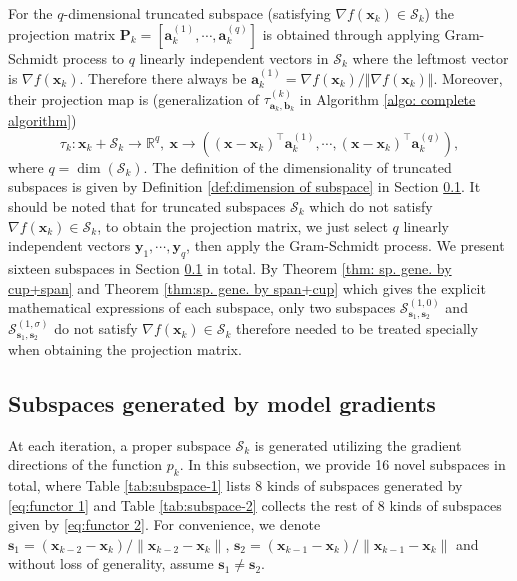 \documentclass[colorlinks=true, linkcolor=blue, citecolor=blue, urlcolor=blue]{article}
\theoremstyle{plain}
\theoremstyle{definition}
\theoremstyle{remark}
\begin{document}
For the $q$-dimensional truncated subspace (satisfying $\nabla f(\bm x_k)\in\mathcal{S}_k$) the projection matrix $\bm P_k=[\bm a_k^{(1)},\cdots,\bm a_k^{(q)}]$ is obtained through applying Gram-Schmidt process to $q$ linearly independent vectors in $\mathcal{S}_k$ where the leftmost vector is $\nabla f(\bm x_k)$. Therefore there always be $\bm a_k^{(1)}=\nabla f(\bm x_k)/\Vert\nabla f(\bm x_k)\Vert$. Moreover, their projection map is (generalization of $\tau_{\bm a_k,\bm b_k}^{(k)}$ in Algorithm \ref{algo: complete algorithm}) \begin{equation*}
    \tau_k: \bm x_k+\mathcal{S}_k\to\mathbb{R}^q,\ \bm x\to ( (\bm x-\bm x_k)^\top\bm a_k^{(1)},\cdots,(\bm x-\bm x_k)^\top\bm a_k^{(q)}),
\end{equation*}
where $q=\dim(\mathcal{S}_k)$. The definition of the dimensionality of truncated subspaces is given by Definition \ref{def:dimension of subspace} in Section \ref{section: subspace and dimension}. It should be noted that for truncated subspaces $\mathcal{S}_k$ which do not satisfy $\nabla f(\bm x_k)\in\mathcal{S}_k$, to obtain the projection matrix, we just select $q$ linearly independent vectors $\bm y_1,\cdots,\bm y_q$, then apply the Gram-Schmidt process. We present sixteen subspaces in Section \ref{section: subspace and dimension} in total. By Theorem \ref{thm: sp. gene. by cup+span} and Theorem \ref{thm:sp. gene. by span+cup} which gives the explicit mathematical expressions of each subspace, only two subspaces $\mathcal{S}_{\bm s_1,\bm s_2}^{(1,0)}$ and $\mathcal{S}_{\bm s_1,\bm s_2}^{(1,\sigma)}$ do not satisfy $\nabla f(\bm x_k)\in \mathcal{S}_k$ therefore needed to be treated specially when obtaining the projection matrix. 


\subsection{Subspaces generated by model gradients}\label{section: subspace and dimension}

At each iteration, a proper subspace $\mathcal{S}_k$ is generated utilizing the gradient directions of the function $p_k$. In this subsection, we provide 16 novel subspaces in total, where Table \ref{tab:subspace-1} lists 8 kinds of subspaces generated by \eqref{eq:functor 1} and Table \ref{tab:subspace-2} collects the rest of 8 kinds of subspaces given by \eqref{eq:functor 2}. For convenience, we denote $\bm s_1=({\bm x_{k-2}-\bm x_k})/{\|\bm x_{k-2}-\bm x_k\|}$, $\bm s_2=({\bm x_{k-1}-\bm x_k})/{\|\bm x_{k-1}-\bm x_k\|}$ and without loss of generality, assume $\bm s_1\neq \bm s_2$.
\end{document}
